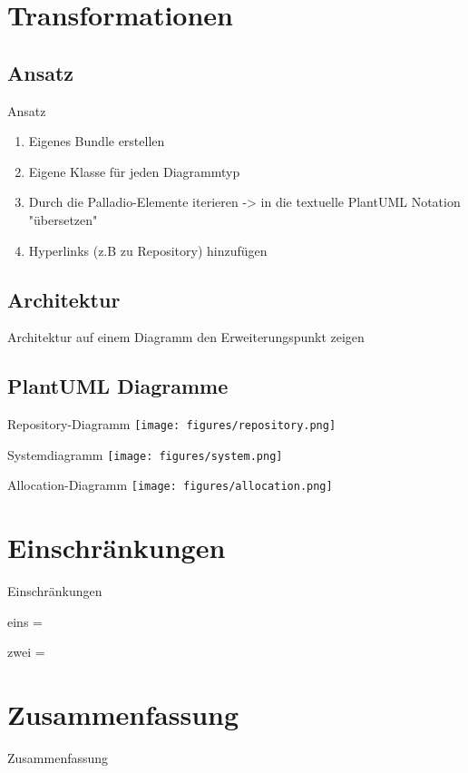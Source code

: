 \documentclass{sdqbeamer}
\begin{document}
\section{Transformationen}
\subsection{Ansatz}
\begin{frame}{Ansatz}
    \begin{enumerate}
        \item Eigenes Bundle erstellen
        \item Eigene Klasse für jeden Diagrammtyp
        \item Durch die Palladio-Elemente iterieren -> in die textuelle PlantUML Notation "übersetzen"
        \item Hyperlinks (z.B zu Repository) hinzufügen
    \end{enumerate}
\end{frame}

\subsection{Architektur}
\begin{frame}{Architektur}
    auf einem Diagramm den Erweiterungspunkt zeigen
\end{frame}

\subsection{PlantUML Diagramme}
\begin{frame}{Repository-Diagramm}
    \texttt{[image: figures/repository.png]}
\end{frame}
\begin{frame}{Systemdiagramm}
    \texttt{[image: figures/system.png]}
\end{frame}
\begin{frame}{Allocation-Diagramm}
    \texttt{[image: figures/allocation.png]}
\end{frame}

\section{Einschränkungen}
\begin{frame}{Einschränkungen}
 	\begin{redblock}{eins}
 		= \texttt{}
    \end{redblock}
     	\begin{redblock}{zwei}
 		= \texttt{}
    \end{redblock}
\end{frame}


\section{Zusammenfassung}
\begin{frame}{Zusammenfassung}
    
\end{frame}

\backupend
\end{document}
